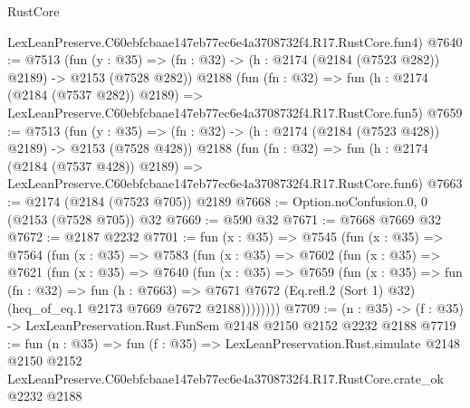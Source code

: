 \begin{lexlean}{RustCore}
\begin{coremodule}
    LexLeanPreserve.C60ebfcbaae147eb77ec6e4a3708732f4.R17.RustCore.fun4)
@7640 := @7513
    (fun (y : @35) => (fn : @32) -> (h : @2174 (@2184 (@7523 @282)) @2189) -> @2153 (@7528 @282))
    @2188
    (fun (fn : @32) =>
    fun (h : @2174 (@2184 (@7537 @282)) @2189) =>
    LexLeanPreserve.C60ebfcbaae147eb77ec6e4a3708732f4.R17.RustCore.fun5)
@7659 := @7513
    (fun (y : @35) => (fn : @32) -> (h : @2174 (@2184 (@7523 @428)) @2189) -> @2153 (@7528 @428))
    @2188
    (fun (fn : @32) =>
    fun (h : @2174 (@2184 (@7537 @428)) @2189) =>
    LexLeanPreserve.C60ebfcbaae147eb77ec6e4a3708732f4.R17.RustCore.fun6)
@7663 := @2174 (@2184 (@7523 @705)) @2189
@7668 := Option.noConfusion.{0, 0} (@2153 (@7528 @705)) @32
@7669 := @590 @32
@7671 := @7668 @7669 @32
@7672 := @2187 @2232
@7701 := fun (x : @35) =>
  @7545
    (fun (x : @35) =>
    @7564
      (fun (x : @35) =>
      @7583
        (fun (x : @35) =>
        @7602
          (fun (x : @35) =>
          @7621
            (fun (x : @35) =>
            @7640
              (fun (x : @35) =>
              @7659
                (fun (x : @35) =>
                fun (fn : @32) =>
                fun (h : @7663) =>
                @7671
                  @7672
                  (Eq.refl.{2} (Sort 1) @32)
                  (heq_of_eq.{1} @2173 @7669 @7672 @2188))))))))
@7709 := (n : @35) -> (f : @35) -> LexLeanPreservation.Rust.FunSem @2148 @2150 @2152 @2232 @2188
@7719 := fun (n : @35) =>
  fun (f : @35) =>
  LexLeanPreservation.Rust.simulate
    @2148
    @2150
    @2152
    LexLeanPreserve.C60ebfcbaae147eb77ec6e4a3708732f4.R17.RustCore.crate_ok
    @2232
    @2188
\end{coremodule}
\end{lexlean}
